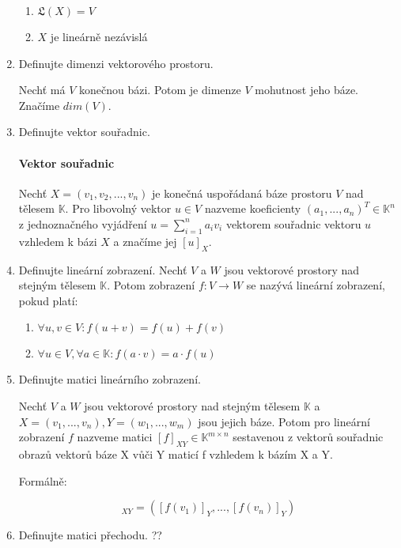 \documentclass[10pt,a4paper]{article}
\begin{document}
\begin{enumerate}
\begin{enumerate}
\item $\mathfrak{L}(X) = V$
\item $X$ je lineárně nezávislá
\end{enumerate}

\item Definujte dimenzi vektorového prostoru. 

Nechť má $V$ konečnou bázi. Potom je dimenze $V$ mohutnost jeho báze. Značíme $dim(V)$.

\item Definujte vektor souřadnic.
\paragraph{Vektor souřadnic}
Nechť $X = (v_1, v_2, ..., v_n)$ je konečná uspořádaná báze prostoru $V$ nad tělesem $\mathbb{K}$. Pro libovolný vektor $u \in V$ nazveme koeficienty $(a_1, ..., a_n)^T \in \mathbb{K}^n$ z jednoznačného vyjádření $u = \displaystyle \sum^n_{i=1} a_i v_i$ vektorem souřadnic vektoru $u$ vzhledem k bázi $X$ a značíme jej $[u]_X$.

\item Definujte lineární zobrazení. 
Nechť $V$ a $W$ jsou vektorové prostory nad stejným tělesem $\mathbb{K}$. Potom zobrazení $f: V \to W$ se nazývá lineární zobrazení, pokud platí:
\begin{enumerate}
\item $\forall u,v \in V: f(u+v) = f(u) + f(v)$
\item $\forall u \in V, \forall a \in \mathbb{K}: f(a\cdot v) = a\cdot f(u)$
\end{enumerate}

\item Definujte matici lineárního zobrazení. 

Nechť $V$ a $W$ jsou vektorové prostory nad stejným tělesem $\mathbb{K}$ a $X = (v_1, ..., v_n), Y=(w_1, ..., w_m)$ jsou jejich báze. Potom pro lineární zobrazení $f$ nazveme matici $[f]_{XY} \in \mathbb{K}^{m \times n}$  sestavenou z vektorů souřadnic obrazů vektorů báze X vůči Y maticí f vzhledem k bázím X a Y.

Formálně:

\begin{equation*}
[f]_{XY} = \left( [f(v_1)]_Y, ..., [f(v_n	)]_Y \right)
\end{equation*}

\item Definujte matici přechodu. ??


\end{enumerate}
\end{document}
